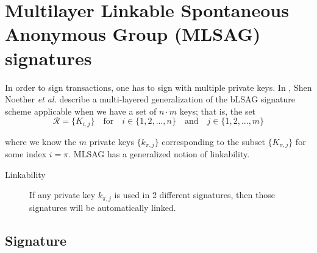 \section{Multilayer Linkable Spontaneous Anonymous Group (MLSAG) signatures}
\label{sec:MLSAG}

In order to sign transactions, one has to sign with multiple private keys. In \cite{MRL-0005-ringct}, Shen Noether {\em et al.} describe a multi-layered generalization of the bLSAG signature scheme applicable when we have a set of \(n \cdot m\) keys; that is, the set\vspace{.175cm}
\[\mathcal{R} = \{K_{i,j}\}  \quad \textrm{for} \quad  i \in \{1, 2, ..., n\} \quad \textrm{and} \quad j \in \{1, 2, ..., m\}\]

where we know the $m$ private keys \(\{k_{\pi, j}\}\) corresponding to the subset \(\{K_{\pi, j}\}\) for some index \(i = \pi\). MLSAG has a generalized notion of linkability.
\begin{description}
	\item[Linkability] If any private key \(k_{\pi, j}\) is used in 2 different signatures, then those signatures will be automatically linked.
\end{description}


\subsection*{Signature}

